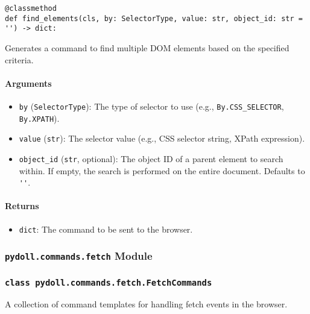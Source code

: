 \documentclass{article}
\begin{document}
\begin{lstlisting}[style=pythonstyle]
@classmethod
def find_elements(cls, by: SelectorType, value: str, object_id: str = '') -> dict:
\end{lstlisting}

\noindent Generates a command to find multiple DOM elements based on the specified criteria.

\paragraph{Arguments}

\begin{itemize}
    \item \lstinline[style=pythonstyle]|by| (\lstinline[style=pythonstyle]|SelectorType|): The type of selector to use (e.g., \lstinline[style=pythonstyle]|By.CSS_SELECTOR|, \lstinline[style=pythonstyle]|By.XPATH|).
    \item \lstinline[style=pythonstyle]|value| (\lstinline[style=pythonstyle]|str|): The selector value (e.g., CSS selector string, XPath expression).
    \item \lstinline[style=pythonstyle]|object_id| (\lstinline[style=pythonstyle]|str|, optional): The object ID of a parent element to search within. If empty, the search is performed on the entire document. Defaults to \lstinline[style=pythonstyle]|''|.
\end{itemize}

\paragraph{Returns}

\begin{itemize}
    \item \lstinline[style=pythonstyle]|dict|: The command to be sent to the browser.
\end{itemize}

\subsubsection*{\texttt{pydoll.commands.fetch} Module}

\subsubsection*{\texttt{class pydoll.commands.fetch.FetchCommands}}
\noindent A collection of command templates for handling fetch events in the browser.
\end{document}
